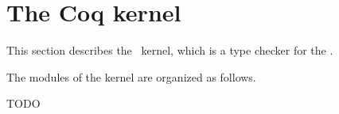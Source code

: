 
\section*{The Coq kernel}

\ocwsection \label{kernel}
This section describes the \Coq\ kernel, which is a type checker for the \CCI.

The modules of the kernel are organized as follows.

TODO
